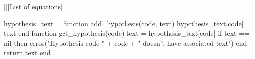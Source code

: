 \usepackage{turnipcite}



\RequirePackage{amsthm}
\theoremstyle{definition}
\newtheorem{definition}{Definition}[chapter]
\newtheorem{example}{Example}[chapter]




\RequirePackage[small,bf]{caption}
\captionsetup{format=hang,justification=centering}

[][List of equations]
\captionsetup[mycapequ]{labelformat=empty}


\RequirePackage{subcaption}
\RequirePackage{adjustbox}




\usepackage[capitalize,nameinlink]{cleveref}
\usepackage{crossreftools}

\let\ORGhypersetup\hypersetup
\protected\def\hypersetup{\ORGhypersetup}


\setcounter{hypI}{0}
\renewcommand{\thehypI}{H-\arabic{hypI}}
\newcommand{\newhyp}{%
    \refstepcounter{hypI}%
    \thehypI%
}

\begin{luacode*}
hypothesis_text = {}
function add_hypothesis(code, text)
    hypothesis_text[code] = text
end
function get_hypothesis(code)
    text = hypothesis_text[code]
    if text == nil then
        error("Hypothesis code " + code + " doesn't have associated text")
    end
    return text
end
\end{luacode*}
\newcommand{\sethyptext}[2]{\luadirect{add_hypothesis(\luastring{#1}, \luastring{#2})}}
\newcommand{\gethyptext}[1]{\luadirect{tex.sprint(get_hypothesis(\luastring{#1}))}}

